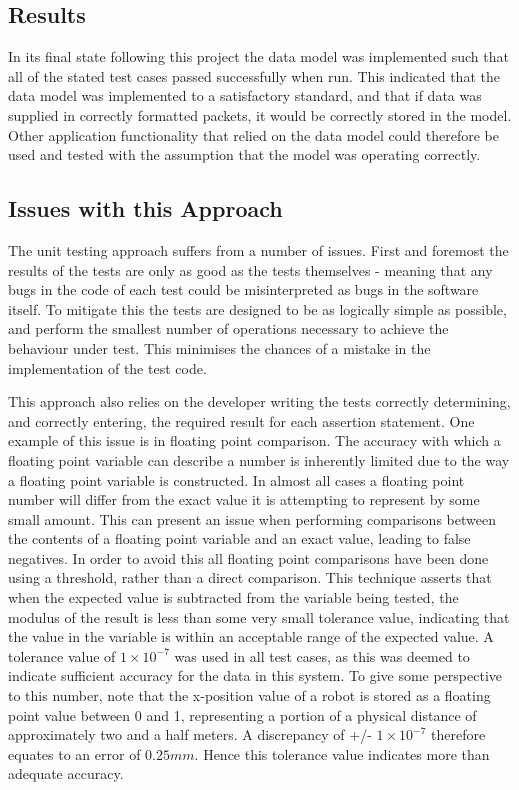 \subsection{Results}
In its final state following this project the data model was implemented such that all of the stated test cases passed successfully when run. This indicated that the data model was implemented to a satisfactory standard, and that if data was supplied in correctly formatted packets, it would be correctly stored in the model. Other application functionality that relied on the data model could therefore be used and tested with the assumption that the model was operating correctly.

\subsection{Issues with this Approach}
The unit testing approach suffers from a number of issues. First and foremost the results of the tests are only as good as the tests themselves - meaning that any bugs in the code of each test could be misinterpreted as bugs in the software itself. To mitigate this the tests are designed to be as logically simple as possible, and perform the smallest number of operations necessary to achieve the behaviour under test. This minimises the chances of a mistake in the implementation of the test code. 

This approach also relies on the developer writing the tests correctly determining, and correctly entering, the required result for each assertion statement. One example of this issue is in floating point comparison. The accuracy with which a floating point variable can describe a number is inherently limited due to the way a floating point variable is constructed. In almost all cases a floating point number will differ from the exact value it is attempting to represent by some small amount. This can present an issue when performing comparisons between the contents of a floating point variable and an exact value, leading to false negatives. In order to avoid this all floating point comparisons have been done using a threshold, rather than a direct comparison. This technique asserts that when the expected value is subtracted from the variable being tested, the modulus of the result is less than some very small tolerance value, indicating that the value in the variable is within an acceptable range of the expected value. A tolerance value of $ 1 \times 10^{-7} $ was used in all test cases, as this was deemed to indicate sufficient accuracy for the data in this system. To give some perspective to this number, note that the x-position value of a robot is stored as a floating point value between 0 and 1, representing a portion of a physical distance of approximately two and a half meters. A discrepancy of +/- $  1 \times 10^{-7} $ therefore equates to an error of $ 0.25 mm $. Hence this tolerance value indicates more than adequate accuracy.

